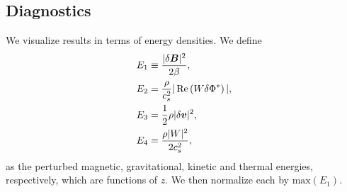 \subsection{Diagnostics}
We visualize results in terms of energy densities. We define
\begin{align}
  &E_1 \equiv \frac{|\delta \bm{B}|^2}{2\beta},\\
  &E_2 = \frac{\rho}{c_s^2}|\operatorname{Re}\left(W\delta \Phi^*\right)|,\\
  &E_3 = \frac{1}{2}\rho|\delta\bm{v}|^2,\\
  &E_4 = \frac{\rho|W|^2}{2c_s^2},
\end{align}
as the perturbed magnetic, gravitational, kinetic and thermal
energies, respectively, which are functions of $z$. We
then normalize each by $\mathrm{max}(E_1)$. 
 
